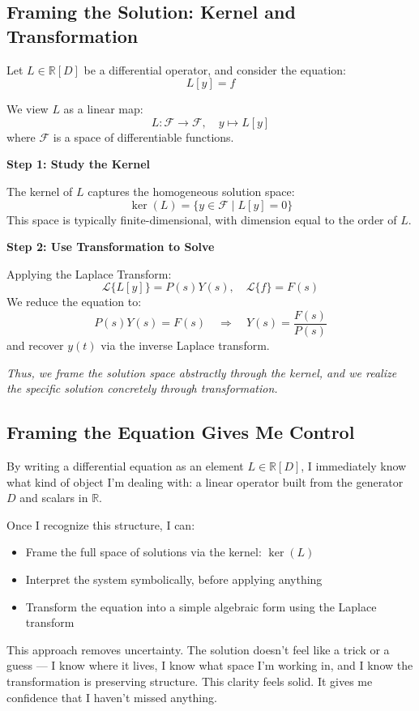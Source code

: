 \documentclass[12pt]{article}
\begin{document}
\subsection*{Framing the Solution: Kernel and Transformation}

Let $L \in \mathbb{R}[D]$ be a differential operator, and consider the equation:
\[
L[y] = f
\]

We view $L$ as a linear map:
\[
L: \mathcal{F} \to \mathcal{F}, \quad y \mapsto L[y]
\]
where $\mathcal{F}$ is a space of differentiable functions.

\textbf{Step 1: Study the Kernel}

The kernel of $L$ captures the homogeneous solution space:
\[
\ker(L) = \{ y \in \mathcal{F} \mid L[y] = 0 \}
\]
This space is typically finite-dimensional, with dimension equal to the order of $L$.

\textbf{Step 2: Use Transformation to Solve}

Applying the Laplace Transform:
\[
\mathcal{L}\{L[y]\} = P(s)Y(s), \quad \mathcal{L}\{f\} = F(s)
\]
We reduce the equation to:
\[
P(s)Y(s) = F(s) \quad \Rightarrow \quad Y(s) = \frac{F(s)}{P(s)}
\]
and recover $y(t)$ via the inverse Laplace transform.

\textit{Thus, we frame the solution space abstractly through the kernel, and we realize the specific solution concretely through transformation.}

\subsection*{Framing the Equation Gives Me Control}

By writing a differential equation as an element $L \in \mathbb{R}[D]$, I immediately know what kind of object I’m dealing with: a linear operator built from the generator $D$ and scalars in $\mathbb{R}$.

Once I recognize this structure, I can:
\begin{itemize}
	\item Frame the full space of solutions via the kernel: $\ker(L)$
	\item Interpret the system symbolically, before applying anything
	\item Transform the equation into a simple algebraic form using the Laplace transform
\end{itemize}

This approach removes uncertainty. The solution doesn’t feel like a trick or a guess — I know where it lives, I know what space I’m working in, and I know the transformation is preserving structure. This clarity feels solid. It gives me confidence that I haven’t missed anything.
\end{document}
